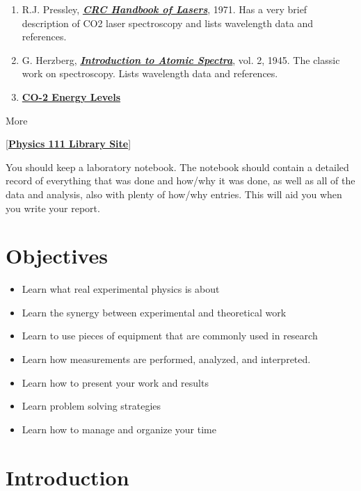 \documentclass{../lab}
\begin{document}
\begin{enumerate}
    \item R.J. Pressley, \emph{\href{http://physics111.lib.berkeley.edu/Physics111/Reprints/CO2/PRESSLEY\_Lasers/CO2\_Pressley\%20Lasers\_index.html}{\textbf{CRC Handbook of Lasers}}}, 1971. Has a very brief description of CO2 laser spectroscopy and lists wavelength data and references.
    \item G. Herzberg, \emph{\href{http://physics111.lib.berkeley.edu/Physics111/Reprints/ATM/02-2ndEd-Atomic\_Spectra\_and\_Atomic\_Structure.pdf}{\textbf{Introduction to Atomic Spectra}}}, vol. 2, 1945. The classic work on spectroscopy. Lists wavelength data and references.
    \item \href{http://experimentationlab.berkeley.edu/sites/default/files/pdfs/CO\_2\%20Energy\%20Levels.pdf}{\textbf{CO-2 Energy Levels}}
\end{enumerate}

More\textbf{ }

[\href{\LabReprints}{\textbf{Physics 111 Library Site}}]

You should keep a laboratory notebook. The notebook should contain a detailed record of everything that was done and how/why it was done, as well as all of the data and analysis, also with plenty of how/why entries. This will aid you when you write your report.

\section{Objectives}

\begin{itemize}
    \item Learn what real experimental physics is about
    \item Learn the synergy between experimental and theoretical work
    \item Learn to use pieces of equipment that are commonly used in research
    \item Learn how measurements are performed, analyzed, and interpreted.
    \item Learn how to present your work and results
    \item Learn problem solving strategies
    \item Learn how to manage and organize your time
\end{itemize}

\section{Introduction}
\end{document}

